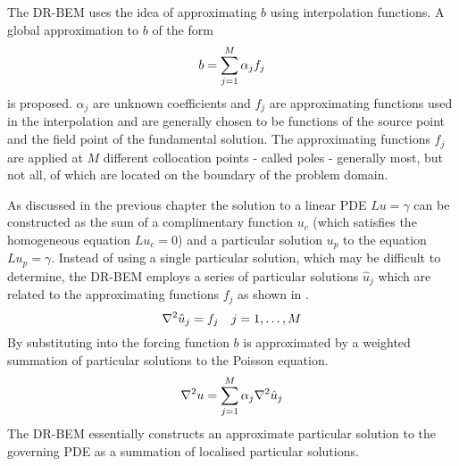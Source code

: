 The DR-BEM uses the idea of approximating $b$ using
interpolation functions.  A global approximation to $b$ of the form
\label{page:alpha}
\begin{equation}
  b =  \displaystyle\sum_{j=1}^{M}  \alpha_{j}f_{j}
\label{eq:globalapprox}
\end{equation}
is proposed.  $\alpha_{j}$ are unknown coefficients and $f_{j}$ are
approximating functions used in the interpolation and are generally chosen
to be functions of the source point and the field point of the fundamental
solution. The approximating functions $f_{j}$ are applied at $M$ different
collocation points - called poles - generally most, but not all, of which
are located on the boundary of the problem domain.

As discussed in the previous chapter the solution to a linear PDE $Lu =
\gamma$ can be constructed as the sum of a complimentary function $u_{c}$
(which satisfies the homogeneous equation $Lu_{c} = 0$) and a particular
solution $u_{p}$ to the equation $Lu_{p} = \gamma$.  Instead of using a
single particular solution, which may be difficult to determine, the DR-BEM
employs a series of particular solutions $\hat{u}_{j}$ which are related to
the approximating functions $f_{j}$ as shown in .
\begin{equation}
  \laplacian{}{\hat{u}_{j}} = f_{j} \quad j = 1, \ldots ,M
\label{eq:harmonic}
\end{equation}
By substituting  into 
the forcing function $b$ is approximated by a weighted summation of
particular solutions to the Poisson equation.
\begin{equation}
  \laplacian{}{u} = \dsuml{j=1}{M} \alpha_{j} \laplacian{}{\hat{u}_{j}}
\label{eq:rhsapprox}
\end{equation}
The DR-BEM essentially constructs an approximate particular solution to the
governing PDE as a summation of localised particular solutions.  

